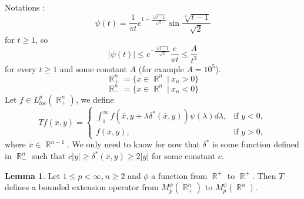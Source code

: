\documentclass[12pt]{article}
\theoremstyle{definition}
\newtheorem{lemma}{Lemma}
\DeclareMathOperator\rr{\mathbb{R}}
\begin{document}
Notations :
\[ \psi(t)=\frac{1}{\pi t}e^{1-\frac{\sqrt[4]{t-1}}{\sqrt{2}}}\sin{\frac{\sqrt[4]{t-1}}{\sqrt 2}}\]
for $t\ge 1$, so
\[ |\psi(t)|\le e^{-\frac{\sqrt[4]{t-1}}{\sqrt2}} \frac{e}{\pi t}\le \frac{A}{t^3} \]
for every $t\ge 1$ and some constant $A$ (for example $A=10^5$).
\[\rr^n_+=\{x \in \rr^n \ | \ x_n>0\}\]
\[\rr^n_-=\{x \in \rr^n \ | \ x_n<0\}\]
Let $f\in L^p_{loc}(\rr^n_+)$, we define 
\[ 	
Tf(\overline x,y)=\begin{cases} 
\int_1^\infty f(\overline x, y+\lambda \delta^*(\overline x,y))\psi(\lambda)d\lambda, & \text{if } y<0, \\
f(\overline x,y), & \text{if } y>0,
\end{cases}
\]
where $\overline x \in \rr^{n-1}$. We only need to know for now that $\delta^*$ is some function defined in $\rr^n_-$ such that $c|y|\ge\delta^*(\overline x,y)\ge 2|y|$ for some constant $c$.
\begin{lemma}
Let $1\le p<\infty,n\ge2$ and $\phi$ a function from $\rr^+$ to $\rr^+$. Then $T$ defines a bounded extension operator from $M_p^\phi(\rr^n_+)$ to  $M_p^\phi(\rr^n)$.
\end{lemma}
\end{document}
